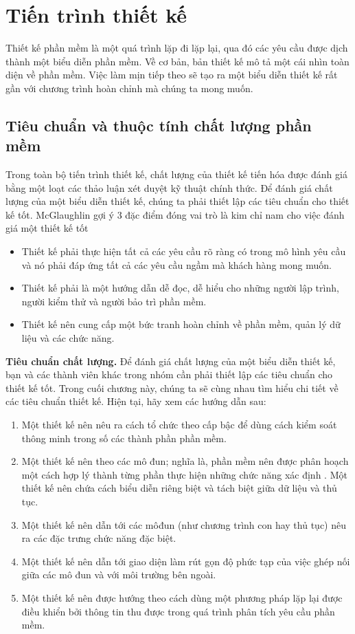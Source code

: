 \documentclass[./../SoftwareEngineering.tex]{subfiles}
\begin{document}
	\section{Tiến trình thiết kế}
	Thiết kế phần mềm là một quá trình lặp đi lặp lại, qua đó các yêu cầu được dịch thành một biểu diễn phần mềm. Về cơ bản, bản thiết kế mô tả một cái nhìn toàn diện về phần mềm. Việc làm mịn tiếp theo sẽ tạo ra một biểu diễn thiết kế rất gần với chương trình hoàn chỉnh mà chúng ta mong muốn.
	
	\subsection{Tiêu chuẩn và thuộc tính chất lượng phần mềm}
	Trong toàn bộ tiến trình thiết kế, chất lượng của thiết kế tiến hóa được đánh giá bằng một loạt các thảo luận xét duyệt kỹ thuật chính thức. Để đánh giá chất lượng của một biểu diễn thiết kế, chúng ta phải thiết lập các tiêu chuẩn cho thiết kế tốt. McGlaughlin \cite{McG91} gợi ý 3 đặc điểm đóng vai trò là kim chỉ nam cho việc đánh giá một thiết kế tốt
	\begin{itemize}
		\item Thiết kế phải thực hiện tất cả các yêu cầu rõ ràng có trong mô hình yêu cầu và nó phải đáp ứng tất cả các yêu cầu ngầm mà khách hàng mong muốn.
		\item Thiết kế phải là một hướng dẫn dễ đọc, dễ hiểu cho những người lập trình, người kiểm thử và người bảo trì phần mềm.
		\item Thiết kế nên cung cấp một bức tranh hoàn chỉnh về phần mềm, quản lý dữ liệu và các chức năng.
	\end{itemize}
	\textbf{Tiêu chuẩn chất lượng.} Để đánh giá chất lượng của một biểu diễn thiết kế, bạn và các thành viên khác trong nhóm cần phải thiết lập các tiêu chuẩn cho thiết kế tốt. Trong cuối chương này, chúng ta sẽ cùng nhau tìm hiểu chi tiết về các tiêu chuẩn thiết kế. Hiện tại, hãy xem các hướng dẫn sau:
	\begin{enumerate}
		\item Một thiết kế nên nêu ra cách tổ chức theo cấp bậc để dùng cách kiểm soát thông minh trong số các thành phần phần mềm.
		\item Một thiết kế nên theo các mô đun; nghĩa là, phần mềm nên được phân hoạch một cách hợp lý thành từng phần thực hiện những chức năng xác định . 
		Một thiết kế nên chứa cách biểu diễn riêng biệt và tách biệt giữa dữ liệu và thủ tục.
		\item Một thiết kế nên dẫn tới các môđun (như chương trình con hay thủ tục) nêu ra các đặc trưng chức năng đặc biệt. 
		\item Một thiết kế nên dẫn tới giao diện làm rút gọn độ phức tạp của việc ghép nối giữa các mô đun và với môi trường bên ngoài. 
		\item Một thiết kế nên được hướng theo cách dùng một phương pháp lặp lại được điều khiển bởi thông tin thu được trong quá trình phân tích yêu cầu phần mềm. 
		
	\end{enumerate}
	
\end{document}
